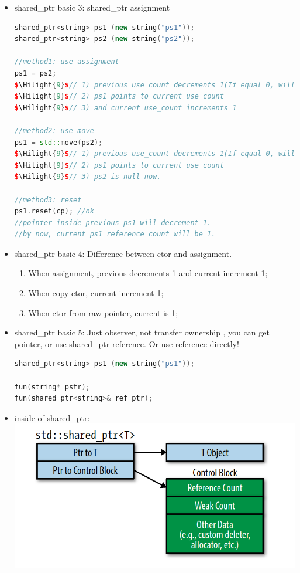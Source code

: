 \documentclass[a4paper,11pt,twoside]{book}
\newcommand{\Hilight}[1]{\makebox[0pt][l]{\color{yellow}\rule[-3pt]{#1em}{11pt}}}
\newcommand{\Hilight}[1]{}
\begin{document}
\begin{itemize}
\item shared\_ptr basic 3: shared\_ptr assignment
\begin{lstlisting}[frame=single, language=c++, mathescape=true]
shared_ptr<string> ps1 (new string("ps1"));
shared_ptr<string> ps2 (new string("ps2"));

//method1: use assignment
ps1 = ps2;
$\Hilight{9}$// 1) previous use_count decrements 1(If equal 0, will delete)
$\Hilight{9}$// 2) ps1 points to current use_count
$\Hilight{9}$// 3) and current use_count increments 1

//method2: use move
ps1 = std::move(ps2);
$\Hilight{9}$// 1) previous use_count decrements 1(If equal 0, will delete)
$\Hilight{9}$// 2) ps1 points to current use_count
$\Hilight{9}$// 3) ps2 is null now. 

//method3: reset
ps1.reset(cp); //ok
//pointer inside previous ps1 will decrement 1.
//by now, current ps1 reference count will be 1.
\end{lstlisting}

\item shared\_ptr basic 4: Difference between ctor and assignment.
\begin{enumerate}
\item When assignment, previous decrements 1 and current increment 1;
\item When copy ctor, current increment 1;
\item When ctor from raw pointer, current is 1;
\end{enumerate}

\item shared\_ptr basic 5: Just observer, not transfer ownership , you can get pointer, or use shared\_ptr reference. Or use reference directly!
\begin{lstlisting}[frame=single, language=c++]
shared_ptr<string> ps1 (new string("ps1"));

fun(string* pstr);
fun(shared_ptr<string>& ref_ptr);
\end{lstlisting}

\item inside of shared\_ptr: \newline
\includegraphics[scale=0.6]{pics/shared.png}


\end{itemize}
\end{document}
